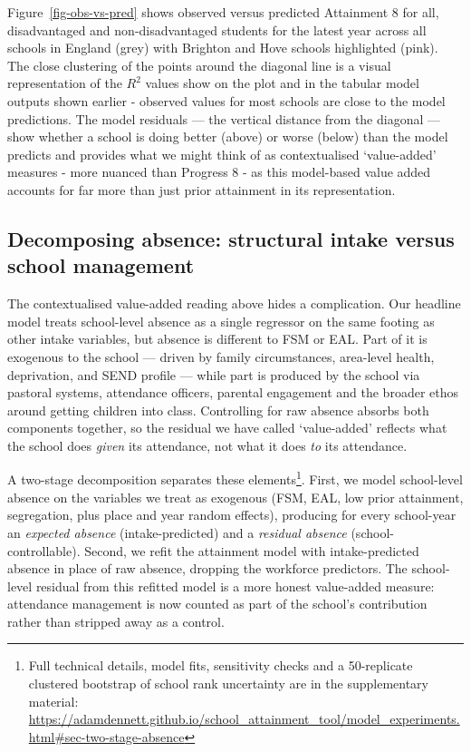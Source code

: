 \documentclass[
  12pt,
  titlepage]{article}
\begin{document}
Figure~\ref{fig-obs-vs-pred} shows observed versus predicted Attainment
8 for all, disadvantaged and non-disadvantaged students for the latest
year across all schools in England (grey) with Brighton and Hove schools
highlighted (pink). The close clustering of the points around the
diagonal line is a visual representation of the \(R^2\) values show on
the plot and in the tabular model outputs shown earlier - observed
values for most schools are close to the model predictions. The model
residuals --- the vertical distance from the diagonal --- show whether a
school is doing better (above) or worse (below) than the model predicts
and provides what we might think of as contextualised `value-added'
measures - more nuanced than Progress 8 - as this model-based value
added accounts for far more than just prior attainment in its
representation.

\subsection{Decomposing absence: structural intake versus school
management}\label{decomposing-absence-structural-intake-versus-school-management}

The contextualised value-added reading above hides a complication. Our
headline model treats school-level absence as a single regressor on the
same footing as other intake variables, but absence is different to FSM
or EAL. Part of it is exogenous to the school --- driven by family
circumstances, area-level health, deprivation, and SEND profile ---
while part is produced by the school via pastoral systems, attendance
officers, parental engagement and the broader ethos around getting
children into class. Controlling for raw absence absorbs both components
together, so the residual we have called `value-added' reflects what the
school does \emph{given} its attendance, not what it does \emph{to} its
attendance.

A two-stage decomposition separates these elements\footnote{Full
  technical details, model fits, sensitivity checks and a 50-replicate
  clustered bootstrap of school rank uncertainty are in the
  supplementary material:
  \url{https://adamdennett.github.io/school_attainment_tool/model_experiments.html\#sec-two-stage-absence}}.
First, we model school-level absence on the variables we treat as
exogenous (FSM, EAL, low prior attainment, segregation, plus place and
year random effects), producing for every school-year an \emph{expected
absence} (intake-predicted) and a \emph{residual absence}
(school-controllable). Second, we refit the attainment model with
intake-predicted absence in place of raw absence, dropping the workforce
predictors. The school-level residual from this refitted model is a more
honest value-added measure: attendance management is now counted as part
of the school's contribution rather than stripped away as a control.
\end{document}

